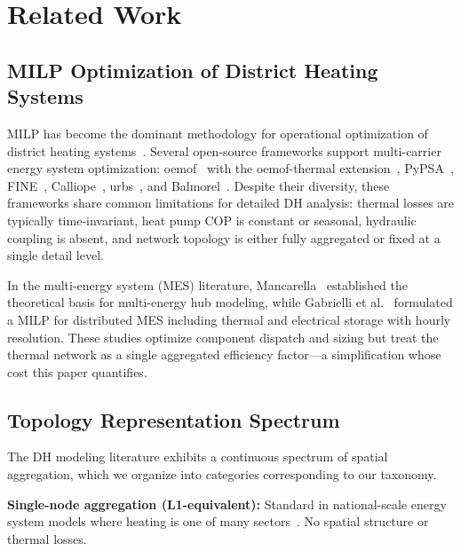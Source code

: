 \documentclass[review,3p]{elsarticle}
\begin{document}
\section{Related Work}
\label{sec:related_work}

\subsection{MILP Optimization of District Heating Systems}
\label{sec:rw_milp}

MILP has become the dominant methodology for operational optimization
of district heating systems~\cite{Fang2016,Guelpa2019review}. Several
open-source frameworks support multi-carrier energy system optimization:
oemof~\cite{Hilpert2018_oemof} with the oemof-thermal
extension~\cite{Krien2020_oemofthermal},
PyPSA~\cite{Brown2018_pypsa}, FINE~\cite{Welder2018_FINE},
Calliope~\cite{Pfenninger2018_calliope}, urbs~\cite{Dorfner2016_urbs},
and Balmorel~\cite{Wiese2018_balmorel}. Despite their diversity, these
frameworks share common limitations for detailed DH analysis: thermal
losses are typically time-invariant, heat pump COP is constant or
seasonal, hydraulic coupling is absent, and network topology is either
fully aggregated or fixed at a single detail level.

In the multi-energy system (MES) literature,
Mancarella~\cite{Mancarella2014} established the theoretical basis
for multi-energy hub modeling, while Gabrielli et
al.~\cite{Gabrielli2018} formulated a MILP for distributed MES
including thermal and electrical storage with hourly resolution.
These studies optimize component dispatch and sizing but treat the
thermal network as a single aggregated efficiency factor---a
simplification whose cost this paper quantifies.

\subsection{Topology Representation Spectrum}
\label{sec:rw_topology}

The DH modeling literature exhibits a continuous spectrum of spatial
aggregation, which we organize into categories corresponding to our
taxonomy.

\textbf{Single-node aggregation (L1-equivalent):} Standard in
national-scale energy system models where heating is one of many
sectors~\cite{Connolly2014_EnergyPLAN,Brown2018_pypsa,
Lund2017_SmartEnergy}. No spatial structure or thermal losses.
\end{document}
